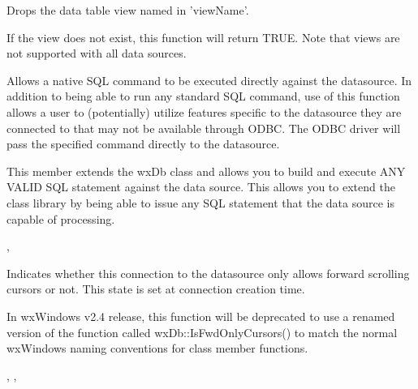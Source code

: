 
Drops the data table view named in 'viewName'.




If the view does not exist, this function will return TRUE.  Note that views are not supported with all data sources.

\label{wxdbexecsql}


Allows a native SQL command to be executed directly against the datasource.  In addition to being able to run any standard SQL command, use of this function allows a user to (potentially) utilize features specific to the datasource they are connected to that may not be available through ODBC.  The ODBC driver will pass the specified command directly to the datasource.




This member extends the wxDb class and allows you to build and execute ANY VALID
SQL statement against the data source.  This allows you to extend the class 
library by being able to issue any SQL statement that the data source is capable
of processing.


, 

\label{wxdbfwdonlycursors}


Indicates whether this connection to the datasource only allows forward scrolling cursors or not.  This state is set at connection creation time.


In wxWindows v2.4 release, this function will be deprecated to use a renamed version of the function called wxDb::IsFwdOnlyCursors() to match the normal wxWindows naming conventions for class member functions.


, , 

